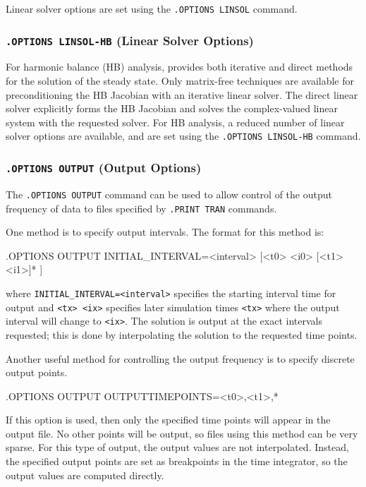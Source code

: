 Linear solver options are set using the \texttt{.OPTIONS LINSOL}
command.



\subsubsection{\texttt{.OPTIONS LINSOL-HB} (Linear Solver Options)}

For harmonic balance (HB) analysis, \Xyce{} provides both iterative 
and direct methods for the solution of the steady state.  Only matrix-free techniques
are available for preconditioning the HB Jacobian with an iterative linear solver.
The direct linear solver explicitly forms the HB Jacobian and solves the complex-valued
linear system with the requested solver.
For HB analysis, a reduced number of linear solver options are available,  
and are set using the \texttt{.OPTIONS LINSOL-HB} command.



\subsubsection{\texttt{.OPTIONS OUTPUT} (Output Options)}

The   \verb+.OPTIONS OUTPUT+
command can be used to allow control of the output frequency of data to files specified
by  \verb+.PRINT TRAN+ commands.  

One method is to specify output intervals.  The format for this method is:
\begin{vquote}
.OPTIONS OUTPUT INITIAL_INTERVAL=<interval> [<t0> <i0> [<t1> <i1>]* ]
\end{vquote}
where \verb+INITIAL_INTERVAL=<interval>+ specifies the starting interval time
for output and \verb+<tx> <ix>+ specifies later simulation times \verb+<tx>+
where the output interval will change to \verb+<ix>+. The solution is output at the
exact intervals requested; this is done by interpolating the solution
to the requested time points.

Another useful method for controlling the output frequency is to specify discrete output
points.  
\begin{vquote}
.OPTIONS OUTPUT OUTPUTTIMEPOINTS=<t0>,<t1>,* 
\end{vquote}
If this option is used, then only the specified time points will appear in the output file.
No other points will be output, so files using this method can be very sparse.  For this type
of output, the output values are not interpolated.  Instead, the specified output points are 
set as breakpoints in the time integrator, so the output values are computed directly.

